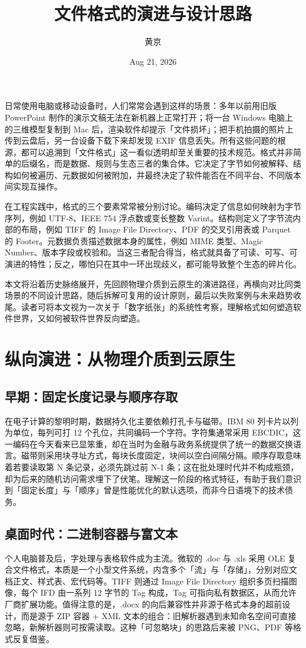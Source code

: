\title{文件格式的演进与设计思路}
\author{黄京}
\date{Aug 21, 2026}
\maketitle
日常使用电脑或移动设备时，人们常常会遇到这样的场景：多年以前用旧版 PowerPoint 制作的演示文稿无法在新机器上正常打开；将一台 Windows 电脑上的三维模型复制到 Mac 后，渲染软件却提示「文件损坏」；把手机拍摄的照片上传到云盘后，另一台设备下载下来却发现 EXIF 信息丢失。所有这些问题的根源，都可以追溯到「文件格式」这一看似透明却至关重要的技术规范。格式并非简单的后缀名，而是数据、规则与生态三者的集合体。它决定了字节如何被解释、结构如何被遍历、元数据如何被附加，并最终决定了软件能否在不同平台、不同版本间实现互操作。\par
在工程实践中，格式的三个要素常常被分别讨论。编码决定了信息如何映射为字节序列，例如 UTF-8、IEEE 754 浮点数或变长整数 Varint。结构则定义了字节流内部的布局，例如 TIFF 的 Image File Directory、PDF 的交叉引用表或 Parquet 的 Footer。元数据负责描述数据本身的属性，例如 MIME 类型、Magic Number、版本字段或校验和。当这三者配合得当，格式就具备了可读、可写、可演进的特性；反之，哪怕只在其中一环出现歧义，都可能导致整个生态的碎片化。\par
本文将沿着历史脉络展开，先回顾物理介质到云原生的演进路径，再横向对比同类场景的不同设计思路，随后拆解可复用的设计原则，最后以失败案例与未来趋势收尾。读者可将本文视为一次关于「数字纸张」的系统性考察，理解格式如何塑造软件世界，又如何被软件世界反向塑造。\par
\chapter{纵向演进：从物理介质到云原生}
\section{早期：固定长度记录与顺序存取}
在电子计算的黎明时期，数据持久化主要依赖打孔卡与磁带。IBM 80 列卡片以列为单位，每列可打 12 个孔位，共同编码一个字符。字符集通常采用 EBCDIC，这一编码在今天看来已显笨重，却在当时为金融与政务系统提供了统一的数据交换语言。磁带则采用块寻址方式，每块长度固定，块间以空白间隔分隔。顺序存取意味着若要读取第 N 条记录，必须先跳过前 N-1 条；这在批处理时代并不构成瓶颈，却为后来的随机访问需求埋下了伏笔。理解这一阶段的格式特征，有助于我们意识到「固定长度」与「顺序」曾是性能优化的默认选项，而非今日语境下的技术债务。\par
\section{桌面时代：二进制容器与富文本}
个人电脑普及后，字处理与表格软件成为主流。微软的 .doc 与 .xls 采用 OLE 复合文件格式，本质是一个小型文件系统，内含多个「流」与「存储」，分别对应文档正文、样式表、宏代码等。TIFF 则通过 Image File Directory 组织多页扫描图像，每个 IFD 由一系列 12 字节的 Tag 构成，Tag 可指向私有数据区，从而允许厂商扩展功能。值得注意的是，.docx 的向后兼容性并非源于格式本身的超前设计，而是源于 ZIP 容器 + XML 文本的组合：旧解析器遇到未知命名空间可直接忽略，新解析器则可按需读取。这种「可忽略块」的思路后来被 PNG、PDF 等格式反复借鉴。\par
